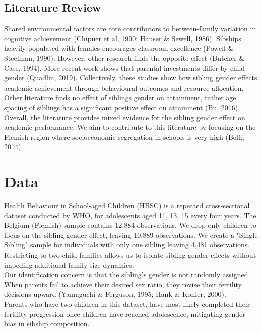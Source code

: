 \documentclass[12pt]{article}
\begin{document}
\subsection{Literature Review}
Shared environmental factors are core contributors to between-family variation in cognitive achievement (Chipuer et al, 1990; Hauser \& Sewell, 1986). Sibships heavily populated with females encourages classroom excellence (Powell \& Steelman, 1990). However, other research finds the opposite effect (Butcher \& Case, 1994). More recent work shows that parental investments differ by child gender (Quadlin, 2019). Collectively, these studies show how sibling gender effects academic achievement through behavioural outcomes and resource allocation.  \\

Other literature finds no effect of siblings gender on attainment, rather age spacing of siblings has a significant positive effect on attainment (Bu, 2016). \\

Overall, the literature provides mixed evidence for the sibling gender effect on academic performance. We aim to contribute to this literature by focusing on the Flemish region where socioeconomic segregation in schools is very high (Belfi, 2014).

\section{Data}
Health Behaviour in School-aged Children (HBSC) is a repeated cross-sectional dataset conducted by WHO, for adolescents aged 11, 13, 15 every four years. The Belgium (Flemish) sample contains 12,884 observations. We drop only children to focus on the sibling gender effect,  leaving 10,889 observations. We create a "Single Sibling" sample for individuals with only one sibling leaving 4,481 observations. Restricting to two-child families allows us to isolate sibling gender effects without impeding additional family-size dynamics. \\
 
Our identification concern is that the sibling's gender is not randomly assigned. When parents fail to achieve their desired sex ratio, they revise their fertility decisions upward (Yamaguchi \& Ferguson, 1995; Hank \& Kohler, 2000). \\

Parents who have two children in this dataset, have most likely completed their fertility progression once children have reached adolescence, mitigating gender bias in sibship composition.
  
\end{document}
